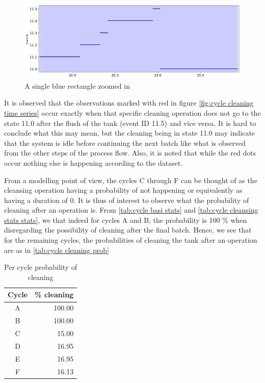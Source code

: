 \documentclass[../Thesis.tex]{subfiles}
\begin{document}
\begin{figure}[h]
    \centering
    \includegraphics[width=0.9\linewidth]{figures/Multiple cycles data/Cleaning batches timeseries single.png}
    \caption{A single blue rectangle zoomed in}
    \label{fig:cycle cleaning time series single}
\end{figure}

It is observed that the observations marked with red in figure \ref{fig:cycle cleaning time series} occur exactly when that specific cleaning operation does not go to the state 11.0 after the flush of the tank (event ID 11.5) and vice versa. It is hard to conclude what this may mean, but the cleaning being in state 11.0 may indicate that the system is idle before continuing the next batch like what is observed from the other steps of the process flow. Also, it is noted that while the red dots occur nothing else is happening according to the dataset.


From a modelling point of view, the cycles C through F can be thought of as the cleansing operation having a probability of not happening or equivalently as having a duration of 0. It is thus of interest to observe what the probability of cleaning after an operation is. From \autoref{tab:cycle basi stats} and \autoref{tab:cycle cleansing stats stats}, we that indeed for cycles A and B, the probability is 100 \% when disregarding the possibility of cleaning after the final batch. Hence, we see that for the remaining cycles, the probabilities of cleaning the tank after an operation are as in \autoref {tab:cycle cleaning prob}

\begin{table}[h]
    \centering
    \begin{tabular}{c|r}
        Cycle & \% cleaning \\ \hline
        A & 100.00 \\
        B & 100.00 \\
        C & 15.00 \\
        D & 16.95\\
        E & 16.95\\
        F & 16.13
    \end{tabular}
    \caption{Per cycle probability of cleaning}
    \label{tab:cycle cleaning prob}
\end{table}
\end{document}
